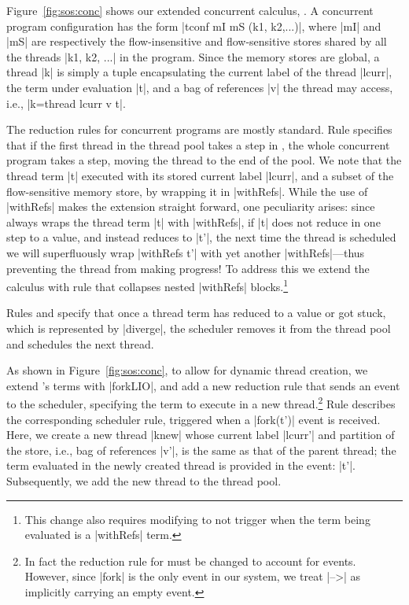 Figure~\ref{fig:sos:conc} shows our extended concurrent calculus, \lioconc{}.
%
A concurrent program configuration has the form |tconf mI mS (k1, k2,...)|,
where |mI| and |mS| are respectively the flow-insensitive and flow-sensitive
stores shared by all the threads |k1, k2, ...| in the program.
%
Since the memory stores are global, a thread |k| is simply a tuple
encapsulating the current label of the thread |lcurr|, the term under
evaluation |t|, and a bag of references |v| the thread may access, i.e.,
|k=thread lcurr v t|.

The reduction rules for concurrent programs are mostly standard.
%
Rule  specifies that if the first thread in the thread pool
takes a step in \lioafs{}, the whole concurrent program takes a step, moving
the thread to the end of the pool.
%
We note that the thread term |t| executed with its stored current label
|lcurr|, and a subset of the flow-sensitive memory store, by wrapping it in
|withRefs|.
%
While the use of |withRefs| makes the extension straight forward, one
peculiarity arises: since  always wraps the thread term |t|
with |withRefs|, if |t| does not reduce in one step to a value, and instead
reduces to |t'|, the next time the thread is scheduled we will superfluously
wrap |withRefs t'| with yet another |withRefs|---thus preventing the thread
from making progress!
%
To address this we extend the calculus with rule  that
collapses nested |withRefs| blocks.\footnote{
This change also requires modifying  to not trigger when
the term being evaluated is a |withRefs| term.
}
 
Rules  and  specify that once a thread term
has reduced to a value or got stuck, which is represented by |diverge|, the
scheduler removes it from the thread pool and schedules the next thread.

%
As shown in Figure~\ref{fig:sos:conc}, to allow for dynamic thread creation, we
extend \lioafs{}'s terms with |forkLIO|, and add a new reduction rule that sends
an event to the scheduler, specifying the term to execute in a new
thread.\footnote{
In fact the reduction rule for \lioafs{} must be changed to account for events.
However, since |fork| is the only event in our system, we treat |-->| as
implicitly carrying an empty event.
}
%
Rule  describes the corresponding scheduler rule, triggered
when a |fork(t')| event is received.
%
Here, we create a new thread |knew| whose current label |lcurr'| and partition
of the store, i.e., bag of references |v'|, is the same as that of the parent
thread; the term evaluated in the newly created thread is provided in the
event: |t'|.
%
Subsequently, we add the new thread to the thread pool.

